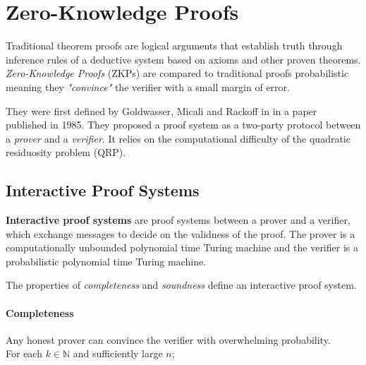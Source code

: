 \section{Zero-Knowledge Proofs}

Traditional theorem proofs are logical arguments that establish truth through inference rules of a deductive system based on axioms and other proven theorems.
\textit{Zero-Knowledge Proofs} (ZKPs) are compared to traditional proofs probabilistic meaning they \textit{"convince"} the verifier with a small margin of error.

They were first defined by Goldwasser, Micali and Rackoff in \cite{GMR} in a paper published in 1985. 
They proposed a proof system as a two-party protocol between a \textit{prover} and a \textit{verifier}. 
It relies on the computational difficulty of the quadratic residuosity problem (QRP).

%

\subsection{Interactive Proof Systems}
\textbf{Interactive proof systems} are proof systems between a prover and a verifier, which exchange messages to decide on the validness of the proof.
The prover is a computationally unbounded polynomial time Turing machine and the verifier is a probabilistic polynomial time Turing machine.


The properties of \textit{completeness} and \textit{soundness} define an interactive proof system.

\paragraph{Completeness}

Any honest prover can convince the verifier with overwhelming probability.\\
For each $k \in \mathbb{N}$ and sufficiently large $n$;


